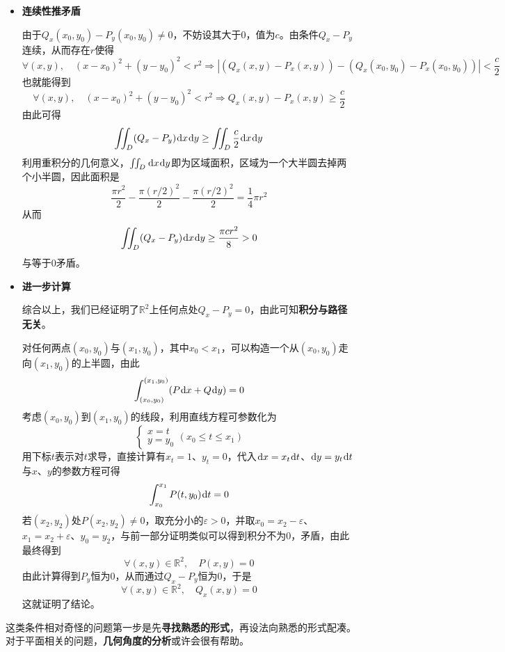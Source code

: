 \documentclass[a4paper,UTF8,fontset=windows,AutoFakeBold]{ctexart}
\newcommand*{\dr}{\hspace{0.07em}\mathrm{d}}
\newcommand*{\rb}{\mathbb{R}}
\newcommand*{\note}{\noindent *}
\theoremstyle{ex}
\begin{document}
\begin{framed}
{\begin{itemize}
        \item \textbf{连续性推矛盾}

        由于$Q_x(x_0,y_0)-P_y(x_0,y_0)\ne0$，不妨设其大于0，值为$c$。由条件$Q_x-P_y$连续，从而存在$r$使得
        $$\forall (x,y),\quad(x-x_0)^2+(y-y_0)^2<r^2\Longrightarrow|(Q_x(x,y)-P_x(x,y))-(Q_x(x_0,y_0)-P_x(x_0,y_0))|<\frac{c}{2}$$
        也就能得到
        $$\forall (x,y),\quad(x-x_0)^2+(y-y_0)^2<r^2\Longrightarrow Q_x(x,y)-P_x(x,y)\ge\frac{c}{2}$$
        由此可得
        $$\iint_D(Q_x-P_y)\dr x\dr y\ge\iint_D\frac{c}{2}\dr x\dr y$$
        利用重积分的几何意义，$\iint_D\dr x\dr y$即为区域面积，区域为一个大半圆去掉两个小半圆，因此面积是
        $$\frac{\pi r^2}{2}-\frac{\pi(r/2)^2}{2}-\frac{\pi(r/2)^2}{2}=\frac{1}{4}\pi r^2$$
        从而
        $$\iint_D(Q_x-P_y)\dr x\dr y\ge\frac{\pi cr^2}{8}>0$$
        与等于0矛盾。
        
        \item \textbf{进一步计算}
        
        综合以上，我们已经证明了$\rb^2$上任何点处$Q_x-P_y=0$，由此可知\textbf{积分与路径无关}。

        对任何两点$(x_0,y_0)$与$(x_1,y_0)$，其中$x_0<x_1$，可以构造一个从$(x_0,y_0)$走向$(x_1,y_0)$的上半圆，由此
        $$\int_{(x_0,y_0)}^{(x_1,y_0)}(P\dr x+Q\dr y)=0$$
        考虑$(x_0,y_0)$到$(x_1,y_0)$的线段，利用直线方程可参数化为
        $$\begin{cases}x=t\\y=y_0\end{cases}(x_0\le t\le x_1)$$
        用下标$t$表示对$t$求导，直接计算有$x_t=1$、$y_t=0$，代入$\dr x=x_t\dr t$、$\dr y=y_t\dr t$与$x$、$y$的参数方程可得
        $$\int_{x_0}^{x_1}P(t,y_0)\dr t=0$$
        若$(x_2,y_2)$处$P(x_2,y_2)\ne0$，取充分小的$\varepsilon>0$，并取$x_0=x_2-\varepsilon$、$x_1=x_2+\varepsilon$、$y_0=y_2$，与前一部分证明类似可以得到积分不为0，矛盾，由此最终得到
        $$\forall(x,y)\in\rb^2,\quad P(x,y)=0$$
        由此计算得到$P_y$恒为0，从而通过$Q_x-P_y$恒为0，于是
        $$\forall(x,y)\in\rb^2,\quad Q_x(x,y)=0$$
        这就证明了结论。
    \end{itemize}
}
\end{framed}

\note 这类条件相对奇怪的问题第一步是先\textbf{寻找熟悉的形式}，再设法向熟悉的形式配凑。对于平面相关的问题，\textbf{几何角度的分析}或许会很有帮助。
\end{document}
